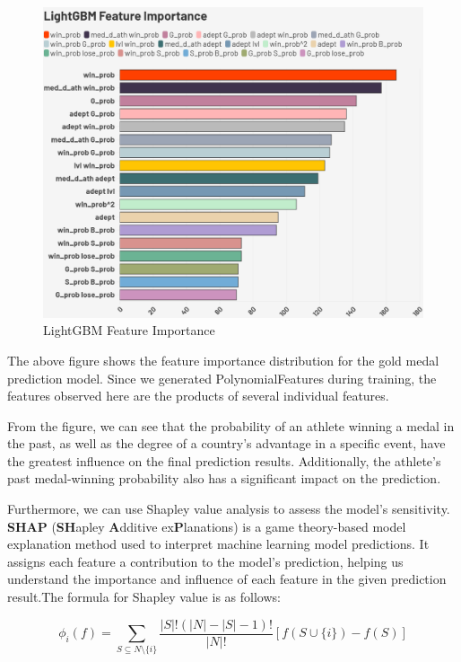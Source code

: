 \documentclass[12pt]{article}  %
\begin{document}
\begin{figure}[H]
	\centering
	\includegraphics[width=13cm]{img/Sensitive Analysis 1.png}
	\caption{LightGBM Feature Importance}
	\label{fig:aa}
\end{figure}

The above figure shows the feature importance distribution for the gold medal prediction model. Since we generated PolynomialFeatures during training, the features observed here are the products of several individual features.

From the figure, we can see that the probability of an athlete winning a medal in the past, as well as the degree of a country's advantage in a specific event, have the greatest influence on the final prediction results. Additionally, the athlete’s past medal-winning probability also has a significant impact on the prediction.

Furthermore, we can use Shapley value analysis to assess the model's sensitivity. \textbf{SHAP} (\textbf{SH}apley \textbf{A}dditive ex\textbf{P}lanations) is a game theory-based model explanation method used to interpret machine learning model predictions. It assigns each feature a contribution to the model's prediction, helping us understand the importance and influence of each feature in the given prediction result.The formula for Shapley value is as follows:


\begin{equation}
	\phi_i(f) = \sum_{S \subseteq N \setminus \{i\}} \frac{|S|!(|N|-|S|-1)!}{|N|!} [ f(S \cup \{i\}) - f(S)]
\end{equation}
\end{document}
